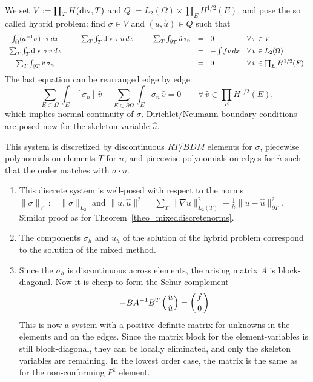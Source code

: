 We set $V := \prod_T H(\operatorname{div}, T)$ and $Q := L_2(\Omega) \times \prod_E
H^{1/2}(E)$, and pose the so called hybrid problem: find $\sigma \in V$ and $(u,\hat
u) \in Q$ such that
$$
\begin{array}{ccccccll}
  \int_\Omega (a^{-1} \sigma) \cdot \tau \, dx & + & 
\sum_T\int_T \operatorname{div} \, \tau  \, u \, dx & + &
\sum_T\int_{\partial T} \hat u \, \tau_n   & = & 0 & \forall \, \tau \in V\\[0.5em]
\sum_T  \int_T \operatorname{div} \, \sigma \, v \, dx & & & & & = & - \int f v \,
                                                        dx & \forall \, v \in L_2(\Omega) \\[0.5em]
  \sum_T\int_{\partial T} \hat v \, \sigma_n   &&&&& = & 0 
                                                         \qquad & \forall \, \hat v \in \prod_E H^{1/2}(E) .  
\end{array}
$$
The last equation can be rearranged edge by edge:
$$
\sum_{E \subset \Omega} \int_E [\sigma_n] \, \hat v +
\sum_{E \subset \partial \Omega} \int_E \sigma_n \, \hat v = 0 \qquad \forall \, \hat v \in \prod_E H^{1/2}(E) ,
$$
which implies normal-continuity of $\sigma$. Dirichlet/Neumann boundary conditions are posed now for the skeleton variable $\hat u$.

This system is discretized by discontinuous $RT/BDM$ elements for $\sigma$, piecewise polynomials on elements $T$ for $u$, 
and piecewise polynomials on edges for $\hat u$ such that the order matches with $\sigma \cdot n$. 
\begin{enumerate}
\item This discrete system is well-posed with respect to the norms $\|
  \sigma \|_V := \| \sigma \|_{L_2}$ and $\| u, \hat u \|^2 = \sum_T
  \| \nabla u \|_{L_2(T)}^2 + \tfrac{1}{h} \| u - \hat u \|_{\partial
    T}^2$. Similar proof as for Theorem~\ref{theo_mixeddiscretenorms}.
\item The components $\sigma_h$ and $u_h$ of the solution of the hybrid problem correspond to the solution of the mixed method.
\item Since the $\sigma_h$ is discontinuous across elements, the arising matrix $A$ is block-diagonal. Now it is cheap to form the Schur complement
$$
-B A^{-1} B^T \left( u \atop \hat u \right) = \left( f \atop 0 \right)
$$
This is now a system with a positive definite matrix for unknowns in the elements and on the edges. Since the matrix block for the element-variables is still block-diagonal, they can be locally eliminated, and only the skeleton variables are remaining. In the lowest order case, the matrix is the same as for 
the non-conforming $P^1$ element.
\end{enumerate}
% 